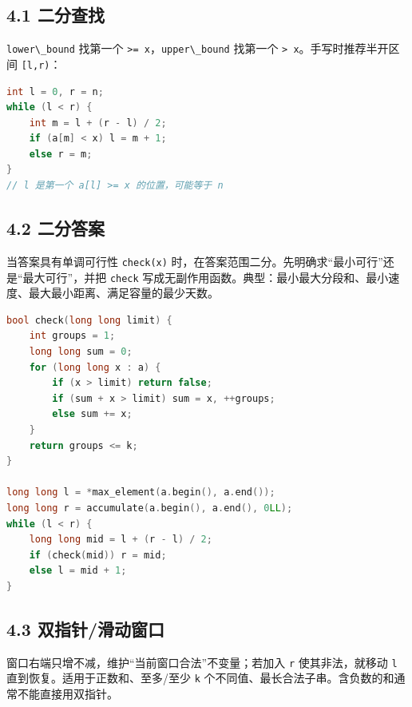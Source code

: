 \subsection{4.1 二分查找}\label{ux4e8cux5206ux67e5ux627e}

\passthrough{\lstinline!lower\_bound!} 找第一个 \passthrough{\lstinline!>= x!}，\passthrough{\lstinline!upper\_bound!} 找第一个 \passthrough{\lstinline!> x!}。手写时推荐半开区间 \passthrough{\lstinline![l,r)!}：

\begin{lstlisting}[language={C++}]
int l = 0, r = n;
while (l < r) {
    int m = l + (r - l) / 2;
    if (a[m] < x) l = m + 1;
    else r = m;
}
// l 是第一个 a[l] >= x 的位置，可能等于 n
\end{lstlisting}

\subsection{4.2 二分答案}\label{ux4e8cux5206ux7b54ux6848}

当答案具有单调可行性 \passthrough{\lstinline!check(x)!} 时，在答案范围二分。先明确求``最小可行''还是``最大可行''，并把 \passthrough{\lstinline!check!} 写成无副作用函数。典型：最小最大分段和、最小速度、最大最小距离、满足容量的最少天数。

\begin{lstlisting}[language={C++}]
bool check(long long limit) {
    int groups = 1;
    long long sum = 0;
    for (long long x : a) {
        if (x > limit) return false;
        if (sum + x > limit) sum = x, ++groups;
        else sum += x;
    }
    return groups <= k;
}

long long l = *max_element(a.begin(), a.end());
long long r = accumulate(a.begin(), a.end(), 0LL);
while (l < r) {
    long long mid = l + (r - l) / 2;
    if (check(mid)) r = mid;
    else l = mid + 1;
}
\end{lstlisting}

\subsection{4.3 双指针/滑动窗口}\label{ux53ccux6307ux9488ux6ed1ux52a8ux7a97ux53e3}

窗口右端只增不减，维护``当前窗口合法''不变量；若加入 \passthrough{\lstinline!r!} 使其非法，就移动 \passthrough{\lstinline!l!} 直到恢复。适用于正数和、至多/至少 \passthrough{\lstinline!k!} 个不同值、最长合法子串。含负数的和通常不能直接用双指针。

